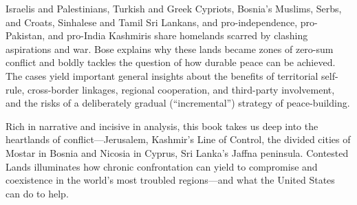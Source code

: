Israelis and Palestinians, Turkish and Greek Cypriots, Bosnia’s Muslims, Serbs, and Croats, Sinhalese and Tamil Sri Lankans, and pro-independence, pro-Pakistan, and pro-India Kashmiris share homelands scarred by clashing aspirations and war. Bose explains why these lands became zones of zero-sum conflict and boldly tackles the question of how durable peace can be achieved. The cases yield important general insights about the benefits of territorial self-rule, cross-border linkages, regional cooperation, and third-party involvement, and the risks of a deliberately gradual (“incremental”) strategy of peace-building.

Rich in narrative and incisive in analysis, this book takes us deep into the heartlands of conflict---Jerusalem, Kashmir’s Line of Control, the divided cities of Mostar in Bosnia and Nicosia in Cyprus, Sri Lanka’s Jaffna peninsula. Contested Lands illuminates how chronic confrontation can yield to compromise and coexistence in the world’s most troubled regions—and what the United States can do to help.


